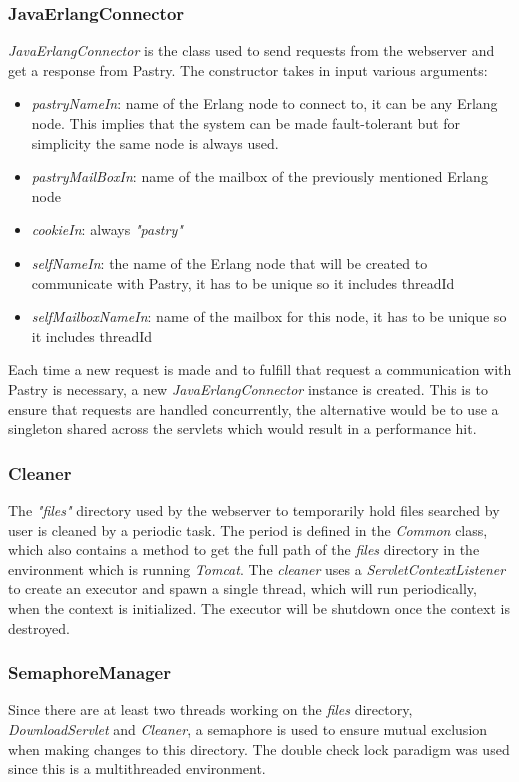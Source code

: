 \documentclass{article}
\begin{document}
\subsubsection{JavaErlangConnector}
\textit{JavaErlangConnector} is the class used to send requests from the webserver and get a response from Pastry. The constructor takes in input various arguments:
\begin{itemize}
    \item \textit{pastryNameIn}: name of the Erlang node to connect to, it can be any Erlang node. This implies that the system can be made fault-tolerant but for simplicity the same node is always used.
    \item \textit{pastryMailBoxIn}: name of the mailbox of the previously mentioned Erlang node
    \item \textit{cookieIn}: always \textit{"pastry"}
    \item \textit{selfNameIn}: the name of the Erlang node that will be created to communicate with Pastry, it has to be unique so it includes threadId
    \item \textit{selfMailboxNameIn}: name of the mailbox for this node, it has to be unique so it includes threadId
\end{itemize}
Each time a new request is made and to fulfill that request a communication with Pastry is necessary, a new \textit{JavaErlangConnector} instance is created. This is to ensure that requests are handled concurrently, the alternative would be to use a singleton shared across the servlets which would result in a performance hit. 

\subsubsection{Cleaner}
The \textit{"files"} directory used by the webserver to temporarily hold files searched by user is cleaned by a periodic task. The period is defined in the \textit{Common} class, which also contains a method to get the full path of the \textit{files} directory in the environment which is running \textit{Tomcat}.
\newline
The \textit{cleaner} uses a \textit{ServletContextListener} to create an executor and spawn a single thread, which will run periodically, when the context is initialized. The executor will be shutdown once the context is destroyed.

\subsubsection{SemaphoreManager}
Since there are at least two threads working on the \textit{files} directory, \textit{DownloadServlet} and \textit{Cleaner}, a semaphore is used to ensure mutual exclusion when making changes to this directory. The double check lock paradigm was used since this is a multithreaded environment.
\end{document}
